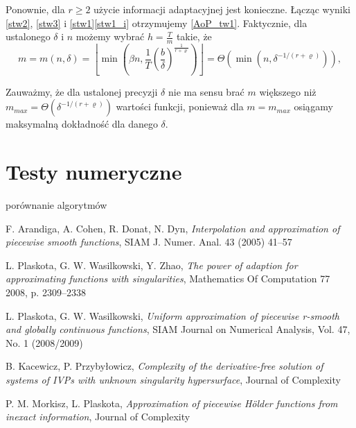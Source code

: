 \documentclass[oik, pdftex, robocza, man]{mgrwms}
\begin{document}
Ponownie, dla $r \geq 2$ użycie informacji adaptacyjnej jest konieczne. Łącząc wyniki \ref{stw2}, \ref{stw3} i \ref{stw1}\ref{stw1_i} otrzymujemy \ref{AoP_tw1}.
Faktycznie, dla ustalonego $\delta$ i $n$ możemy wybrać $h = \frac{T}{m}$ takie, że
\begin{equation}
    m = m(n, \delta)=\left\lfloor\min \left(\beta n, \frac{1}{T}\left(\frac{b}{\delta}\right)^{\frac{1}{r+\varrho}}\right)\right\rfloor=\varTheta\left(\min \left(n, \delta^{-1 /(r+\varrho)}\right)\right),
\end{equation}

\begin{uw}
    Zauważmy, że dla ustalonej precyzji $\delta$ nie ma sensu brać $m$ większego niż $m_{max} = \varTheta(\delta^{-1 / (r+\varrho)})$ wartości funkcji, ponieważ dla $m = m_{max}$ osiągamy maksymalną dokładność dla danego $\delta$.
\end{uw}




\mgrclosechapter



\chapter{Testy numeryczne}

porównanie algorytmów

\mgrclosechapter





%  
\begin{thebibliography}{88}

    F. Arandiga, A. Cohen, R. Donat, N. Dyn,
    \emph{Interpolation and approximation of piecewise smooth functions}, SIAM J. Numer. Anal. 43 (2005) 41–57

    L. Plaskota, G. W. Wasilkowski, Y. Zhao, 
    \emph{The power of adaption for approximating functions with singularities}, Mathematics Of Computation 77
    2008, p. 2309–2338

    L. Plaskota, G. W. Wasilkowski, 
    \emph{Uniform approximation of piecewise r-smooth and globally continuous functions}, SIAM Journal on Numerical
    Analysis, Vol. 47, No. 1 (2008/2009)

    B. Kacewicz, P. Przybyłowicz, 
    \emph{Complexity of the derivative-free solution of
    systems of IVPs with unknown singularity hypersurface}, Journal of Complexity
    
    P. M. Morkisz, L. Plaskota, 
    \emph{Approximation of piecewise Hölder functions from inexact information}, Journal of Complexity

\end{thebibliography}
\end{document}
